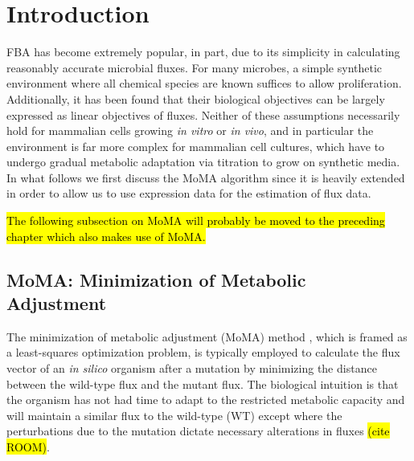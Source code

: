 \section{Introduction}

%
%
FBA has become extremely popular, in part, due to its simplicity in
calculating reasonably accurate microbial fluxes. For many microbes, a
simple synthetic environment where all chemical species are known
suffices to allow proliferation. Additionally, it has been found that
their biological objectives can be largely expressed as linear
objectives of fluxes.  Neither of these assumptions necessarily hold
for mammalian cells growing \emph{in vitro} or \emph{in vivo}, and in
particular the environment is far more complex for mammalian cell
cultures, which have to undergo gradual metabolic adaptation via
titration to grow on synthetic media. In what follows we first discuss
the MoMA algorithm since it is heavily extended in order to allow us
to use expression data for the estimation of flux data.

\hl{The following subsection on MoMA will probably be moved to the
preceding chapter which also makes use of MoMA.}

\subsection{MoMA: Minimization of Metabolic Adjustment}

The minimization of metabolic adjustment (MoMA) method \cite{Segre2002}, 
which is framed as a least-squares optimization problem, is typically employed
to calculate the flux vector of an \emph{in silico} organism after a
mutation by minimizing the distance between the wild-type flux and the
mutant flux. The biological intuition is that the organism has not had
time to adapt to the restricted metabolic capacity and will maintain a
similar flux to the wild-type (WT) except where the perturbations due
to the mutation dictate necessary alterations in fluxes \hl{(cite ROOM)}.

